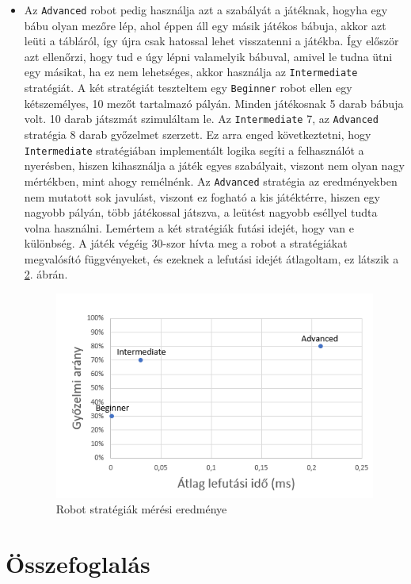 \documentclass[a4paper,twoside]{article}
\begin{document}
\begin{itemize}
\begin{figure}
		\label{findClos}
	\end{figure}
	\FloatBarrier
	\item  Az \verb|Advanced| robot pedig használja azt a szabályát a játéknak, hogyha egy bábu olyan mezőre lép, ahol éppen áll egy másik játékos bábuja, akkor azt leüti a tábláról, így újra csak hatossal lehet visszatenni a játékba. Így először azt ellenőrzi, hogy tud e úgy lépni valamelyik bábuval, amivel le tudna ütni egy másikat, ha ez nem lehetséges, akkor használja az \verb|Intermediate| stratégiát.
	A két stratégiát teszteltem egy \verb|Beginner| robot ellen egy kétszemélyes, 10 mezőt tartalmazó pályán. Minden játékosnak 5 darab bábuja volt. 10 darab játszmát szimuláltam le. Az \verb|Intermediate| 7, az \verb|Advanced| stratégia 8 darab győzelmet szerzett. Ez arra enged következtetni, hogy \verb|Intermediate| stratégiában implementált logika segíti a felhasználót a nyerésben, hiszen kihasználja a játék egyes szabályait, viszont nem olyan nagy mértékben, mint ahogy remélnénk. Az \verb|Advanced| stratégia az eredményekben nem mutatott sok javulást, viszont ez fogható a kis játéktérre, hiszen egy nagyobb pályán, több játékossal játszva, a leütést nagyobb eséllyel tudta volna használni. Lemértem a két stratégiák futási idejét, hogy van e különbség. A játék végéig 30-szor hívta meg a robot a stratégiákat megvalósító függvényeket, és ezeknek a lefutási idejét átlagoltam, ez látszik a \ref{robot-abra}. ábrán. 
	\begin{figure}
		\caption{Robot stratégiák mérési eredménye}
		\label{robot-abra}
		\centering
		\includegraphics[scale=0.6]{robot-abra}
	\end{figure}
\end{itemize}
 

\section{Összefoglalás}
\end{document}
